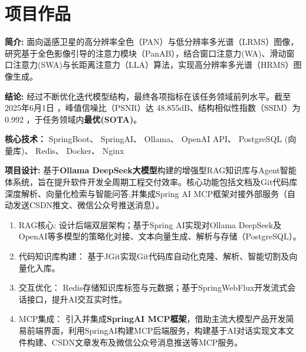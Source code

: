 \documentclass{resume}
\begin{document}
\section{项目作品}

  \vspace{0.3cm}
\begin{itemize}[parsep=0.2ex]
  {\small 
  \item \textbf{简介:} 面向遥感卫星的高分辨率全色（PAN）与低分辨率多光谱（LRMS）图像，研究基于全色影像引导的注意力模块（PanAB），结合窗口注意力(WA)、滑动窗口注意力(SWA)与长距离注意力（LLA）算法，实现高分辨率多光谱（HRMS）图像生成。 
  \item \textbf{结论:} 经过不断优化迭代模型结构，最终各项指标在该任务领域前列水平。截至2025年6月1日 ，峰值信噪比（PSNR）达 48.855dB、结构相似性指数（SSIM）为 0.992 ，于任务领域内\textbf{最优(SOTA)}。 }
\end{itemize}
  \vspace{0.1cm}

\begin{itemize}
  {\small
  \vspace{0.1cm}
  \item \textbf{核心技术：}  SpringBoot、 SpringAI、 Ollama、 OpenAI API、 PostgreSQL (向量库)、 Redis、 Docker、 Nginx

  \vspace{0.1cm}
  \item \textbf{项目设计:} 基于\textbf{Ollama DeepSeek大模型}构建的增强型RAG知识库与Agent智能体系统，旨在提升软件开发全周期工程交付效率。核心功能包括文档及Git代码库深度解析、向量化检索与智能问答,并集成Spring AI MCP框架对接外部服务（自动发送CSDN推文、微信公众号推送消息）。

 \begin{enumerate}[leftmargin = 0.3em, topsep=2pt, itemsep=0pt, parsep=0pt]
  \item  RAG核心: 设计后端双层架构；基于Spring AI实现对Ollama DeepSeek及OpenAI等多模型的策略化对接、文本向量生成、解析与存储（PostgreSQL）。

  \vspace{0.1cm}
  \item 代码知识库构建： 基于JGit实现Git代码库自动化克隆、解析、智能切割及向量化入库。
  \vspace{0.1cm}
  \item 交互优化： Redis存储知识库标签与元数据；基于SpringWebFlux开发流式会话接口，提升AI交互实时性。
  \vspace{0.1cm}
  \item MCP集成： 引入并集成\textbf{SpringAI MCP框架}，借助主流大模型产品开发简易前端界面，利用SpringAI构建MCP后端服务，构建基于AI对话实现文本文件构建、CSDN文章发布及微信公众号消息推送等MCP服务。
  \vspace{0.1cm}
 \end{enumerate}


  }
\end{itemize}
\end{document}
